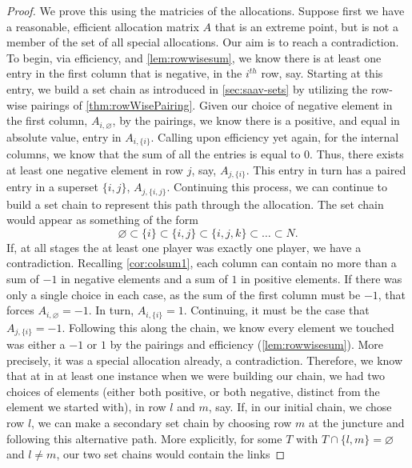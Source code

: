 \documentclass[12pt,letterpaper,final]{article}
\theoremstyle{plain}
\theoremstyle{plain}
\theoremstyle{plain}
\theoremstyle{plain}
\theoremstyle{plain}
\theoremstyle{plain}
\theoremstyle{plain}
\theoremstyle{definition}
\theoremstyle{definition}
\theoremstyle{definition}
\theoremstyle{definition}
\theoremstyle{definition}
\theoremstyle{remark}
\theoremstyle{remark}
\theoremstyle{remark}
\theoremstyle{remark}
\begin{document}
\begin{proof}
  We prove this using the matricies of the allocations.
  Suppose first we have a reasonable, efficient allocation matrix \(A\) that is an extreme point,
  but is not a member of the set of all special allocations. Our aim is to reach
  a contradiction. To begin, via efficiency, and
  \cref{lem:rowwisesum}, we know there is at least one entry in the
  first column that is negative, in the \(i^{th}\) row, say. Starting
  at this entry, we build a set chain as introduced in
  \cref{sec:saav-sets} by utilizing the row-wise pairings 
  of \cref{thm:rowWisePairing}. Given our choice of negative element
  in the first column, \(A_{i,\varnothing}\), by the pairings, we know
  there is a positive, and equal in absolute value, entry in \(A_{i,\{i\}}\). Calling
  upon efficiency yet again, for the internal columns, we know that
  the sum of all the entries is equal to \(0\). Thus, there exists
  at least one negative element in row \(j\), say,
  \(A_{j,\{i\}}\). This entry in turn has a
  paired entry in a superset \(\{i,j\}\), \(A_{j,\{i,j\}}\). Continuing this
  process, we can continue to build a set chain to represent this path
  through the allocation. The set chain would appear as something of
  the form 
  \[
    \varnothing \subset \{i\} \subset \{i,j\} \subset \{i,j,k\}
    \subset \dots \subset N.
  \]
  If, at all stages the
  at least one player was exactly one player, we have a contradiction. Recalling
  \cref{cor:colsum1}, each column can 
  contain no more than a sum of \(-1\) in negative elements and a sum
  of \(1\) in positive elements. If there was only a single choice in
  each case, as the sum of the first column must be \(-1\), that
  forces \(A_{i, \varnothing}=-1\). In turn, \(A_{i,\{i\}}
  =1\). Continuing, it must be the case that \(A_{j,\{i\}}=-1\).
  Following this along the chain, we know every element we touched was
  either a \(-1\) or \(1\) by the pairings and efficiency
  (\cref{lem:rowwisesum}). More precisely, it was a special allocation already,
  a contradiction.  Therefore, we know that at in at least one
  instance when we were building our chain, we had two choices of
  elements (either both positive, or both negative, distinct from the
  element we started with), in row \(l\) and \(m\), say.
  If, in our initial chain, we chose row \(l\), we can make a secondary
  set chain by choosing row \(m\) at the juncture and following this alternative
  path. More explicitly, for some \(T\) with  \(T \cap\{l,m\} =
  \varnothing\) and \(l\neq m\), our two set chains would contain the links 

\end{proof}
\end{document}
